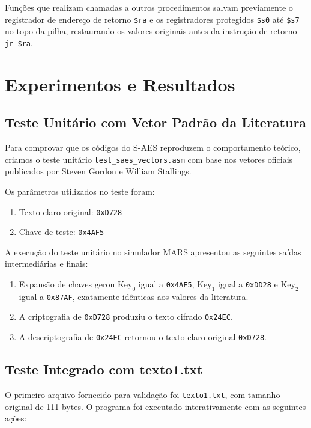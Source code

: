 \documentclass[12pt,a4paper]{article}
\begin{document}
Funções que realizam chamadas a outros procedimentos salvam previamente o registrador de endereço de retorno \texttt{\$ra} e os registradores protegidos \texttt{\$s0} até \texttt{\$s7} no topo da pilha, restaurando os valores originais antes da instrução de retorno \texttt{jr \$ra}.

\section{Experimentos e Resultados}

\subsection{Teste Unitário com Vetor Padrão da Literatura}

Para comprovar que os códigos do S-AES reproduzem o comportamento teórico, criamos o teste unitário \texttt{test\_saes\_vectors.asm} com base nos vetores oficiais publicados por Steven Gordon e William Stallings.

Os parâmetros utilizados no teste foram:

\begin{enumerate}
    \item Texto claro original: \texttt{0xD728}
    \item Chave de teste: \texttt{0x4AF5}
\end{enumerate}

A execução do teste unitário no simulador MARS apresentou as seguintes saídas intermediárias e finais:

\begin{enumerate}
    \item Expansão de chaves gerou $\text{Key}_0$ igual a \texttt{0x4AF5}, $\text{Key}_1$ igual a \texttt{0xDD28} e $\text{Key}_2$ igual a \texttt{0x87AF}, exatamente idênticas aos valores da literatura.
    \item A criptografia de \texttt{0xD728} produziu o texto cifrado \texttt{0x24EC}.
    \item A descriptografia de \texttt{0x24EC} retornou o texto claro original \texttt{0xD728}.
\end{enumerate}

\subsection{Teste Integrado com texto1.txt}

O primeiro arquivo fornecido para validação foi \texttt{texto1.txt}, com tamanho original de 111 bytes. O programa foi executado interativamente com as seguintes ações:
\end{document}
